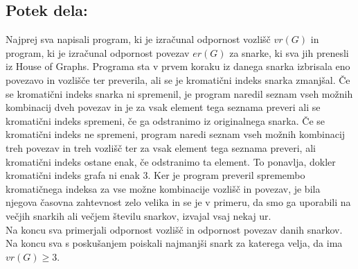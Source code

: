 \documentclass[a4paper, 10pt]{article}
\begin{document}
\subsection*{Potek dela:}
Najprej sva napisali program, ki je izračunal odpornost vozlišč $vr(G)$ in program, ki je 
izračunal odpornost povezav $er(G)$ za snarke, ki sva jih prenesli iz House of Graphs.
Programa sta v prvem koraku iz danega snarka izbrisala eno povezavo in vozlišče ter
preverila, ali se je kromatični indeks snarka zmanjšal. Če se kromatični indeks snarka ni 
spremenil, je program naredil seznam vseh možnih kombinacij dveh povezav in je za vsak element tega
seznama preveri ali se kromatični indeks spremeni, če ga odstranimo iz originalnega snarka. Če se 
kromatični indeks ne spremeni, program naredi seznam vseh možnih kombinacij treh povezav in treh vozlišč
ter za vsak element tega seznama preveri, ali kromatični indeks ostane enak, če odstranimo ta element.
To ponavlja, dokler kromatični indeks grafa ni enak 3. Ker je program preveril spremembo kromatičnega
indeksa za vse možne kombinacije vozlišč in povezav, je bila njegova časovna zahtevnost zelo velika
in se je v primeru, da smo ga uporabili na večjih snarkih ali večjem številu snarkov, izvajal vsaj nekaj ur.\\
Na koncu sva primerjali odpornost vozlišč in odpornost povezav danih snarkov. Na koncu sva s poskušanjem 
poiskali najmanjši snark za katerega velja, da ima $vr(G) \ge 3$.
\end{document}
